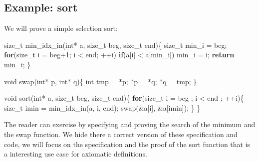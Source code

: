 \documentclass[12pt,francais,]{scrbook}
\newenvironment{Shaded}{}{}
\newcommand{\KeywordTok}[1]{\textcolor[rgb]{0.00,0.44,0.13}{\textbf{{#1}}}}
\newcommand{\DataTypeTok}[1]{\textcolor[rgb]{0.56,0.13,0.00}{{#1}}}
\newcommand{\DecValTok}[1]{\textcolor[rgb]{0.25,0.63,0.44}{{#1}}}
\newcommand{\NormalTok}[1]{{#1}}
\begin{document}
\subsection{Example: sort}\label{example-sort}

We will prove a simple selection sort:

\begin{footnotesize}\begin{Shaded}
\begin{Highlighting}[]
\NormalTok{size_t min_idx_in(}\DataTypeTok{int}\NormalTok{* a, size_t beg, size_t end)\{}
  \NormalTok{size_t min_i = beg;}
  \KeywordTok{for}\NormalTok{(size_t i = beg}\DecValTok{+1}\NormalTok{; i < end; ++i)}
    \KeywordTok{if}\NormalTok{(a[i] < a[min_i]) min_i = i;}
  \KeywordTok{return} \NormalTok{min_i;}
\NormalTok{\}}

\DataTypeTok{void} \NormalTok{swap(}\DataTypeTok{int}\NormalTok{* p, }\DataTypeTok{int}\NormalTok{* q)\{}
  \DataTypeTok{int} \NormalTok{tmp = *p; *p = *q; *q = tmp;}
\NormalTok{\}}

\DataTypeTok{void} \NormalTok{sort(}\DataTypeTok{int}\NormalTok{* a, size_t beg, size_t end)\{}
  \KeywordTok{for}\NormalTok{(size_t i = beg ; i < end ; ++i)\{}
    \NormalTok{size_t imin = min_idx_in(a, i, end);}
    \NormalTok{swap(&a[i], &a[imin]);}
  \NormalTok{\}}
\NormalTok{\}}
\end{Highlighting}
\end{Shaded}\end{footnotesize}

The reader can exercise by specifying and proving the search of the
minimum and the swap function. We hide there a correct version of these
specification and code, we will focus on the specification and the proof
of the sort function that is a interesting use case for axiomatic
definitions.
\end{document}
